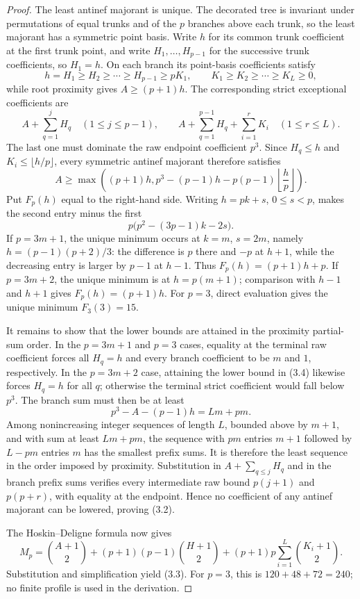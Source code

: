 \documentclass[12pt,a4paper]{article}
\theoremstyle{definition}
\begin{document}
\begin{proof}
The least antinef majorant is unique.  The decorated tree is invariant under
permutations of equal trunks and of the $p$ branches above each trunk, so the
least majorant has a symmetric point basis.  Write $h$ for its common trunk
coefficient at the first trunk point, and write $H_1,\ldots,H_{p-1}$ for
the successive trunk coefficients, so $H_1=h$.  On each branch its
point-basis coefficients satisfy
\[
 h=H_1\geq H_2\geq\cdots\geq H_{p-1}\geq pK_1,
 \qquad
 K_1\geq K_2\geq\cdots\geq K_L\geq0,
\]
while root proximity gives $A\geq(p+1)h$.  The corresponding strict
exceptional coefficients are
\[
 A+\sum_{q=1}^{j}H_q\quad(1\leq j\leq p-1),\qquad
 A+\sum_{q=1}^{p-1}H_q+\sum_{i=1}^{r}K_i
 \quad(1\leq r\leq L).
\]
The last one must dominate the raw endpoint coefficient $p^3$.  Since
$H_q\leq h$ and $K_i\leq\lfloor h/p\rfloor$, every symmetric antinef
majorant therefore satisfies
\[
 A\geq\max\left((p+1)h,
 p^3-(p-1)h-p(p-1)\left\lfloor\frac hp\right\rfloor\right).
\tag{3.4}
\]
Put $F_p(h)$ equal to the right-hand side.  Writing $h=pk+s$,
$0\leq s<p$, makes the second entry minus the first
\[
 p\bigl(p^2-(3p-1)k-2s\bigr).
\]
If $p=3m+1$, the unique minimum occurs at
$k=m$, $s=2m$, namely $h=(p-1)(p+2)/3$: the difference is $p$ there and
$-p$ at $h+1$, while the decreasing entry is larger by $p-1$ at $h-1$.
Thus $F_p(h)=(p+1)h+p$.  If $p=3m+2$, the unique minimum is at
$h=p(m+1)$; comparison with $h-1$ and $h+1$ gives $F_p(h)=(p+1)h$.
For $p=3$, direct evaluation gives the unique minimum $F_3(3)=15$.

It remains to show that the lower bounds are attained in the proximity
partial-sum order.  In the
$p=3m+1$ and $p=3$ cases, equality at the terminal raw coefficient forces
all $H_q=h$ and every branch coefficient to be $m$ and $1$, respectively.
In the $p=3m+2$ case, attaining the lower bound in (3.4) likewise forces
$H_q=h$ for all $q$; otherwise the terminal strict coefficient would fall
below $p^3$.  The branch sum must then be at least
\[
 p^3-A-(p-1)h=Lm+pm.
\]
Among nonincreasing integer sequences of length $L$, bounded above by
$m+1$, and with sum at least $Lm+pm$, the sequence with $pm$ entries
$m+1$ followed by $L-pm$ entries $m$ has the smallest prefix sums.
It is therefore the least sequence in the order imposed by proximity.
Substitution in
$A+\sum_{q\leq j}H_q$ and in the branch prefix sums verifies every
intermediate raw bound
$p(j+1)$ and $p(p+r)$, with equality at the endpoint.  Hence no coefficient
of any antinef majorant can be lowered, proving (3.2).

The Hoskin--Deligne formula \cite{LIP93,LW03} now gives
\[
 M_p=\binom{A+1}{2}+(p+1)(p-1)\binom{H+1}{2}
 +(p+1)p\sum_{i=1}^{L}\binom{K_i+1}{2}.
\tag{3.5}
\]
Substitution and simplification yield (3.3).  For $p=3$, this is
$120+48+72=240$; no finite profile is used in the derivation.
\end{proof}
\end{document}
